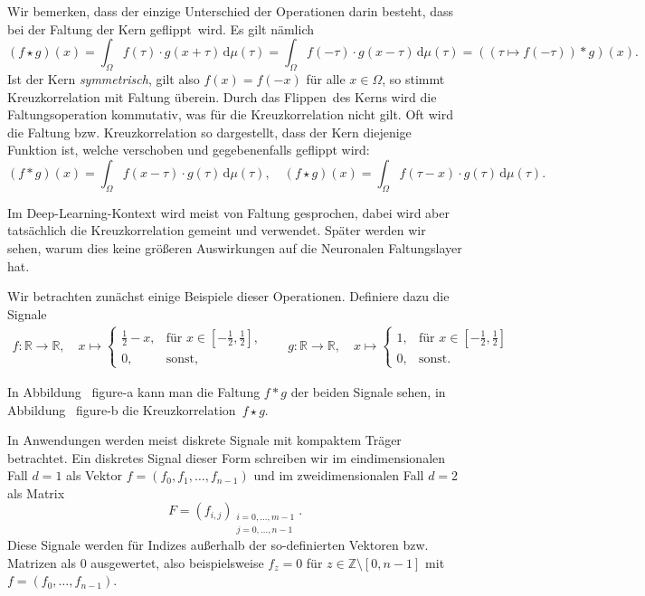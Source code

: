 \documentclass{article}
\theoremstyle{definition}
\newcommand{\R}{\mathbb{R}}
\newcommand{\Z}{\mathbb{Z}}
\newcommand{\diff}{\,\textrm{d}}
\newcommand{\todo}[1]{{\color{red} #1}}
\begin{document}
Wir bemerken, dass der einzige Unterschied der Operationen darin besteht, dass bei der Faltung der Kern \glqq geflippt\grqq\ wird.
Es gilt nämlich \[
    \left(f \star g\right)(x) = \int_{\Omega} f(\tau) \cdot g(x+\tau) \diff\mu(\tau) = \int_\Omega f(-\tau) \cdot g(x - \tau) \diff\mu(\tau) = \left((\tau\mapsto f(-\tau)) * g\right)(x).
    \]
Ist der Kern \emph{symmetrisch}, gilt also $f(x) = f(-x)$ für alle $x\in\Omega$, so stimmt Kreuzkorrelation mit Faltung überein.
Durch das \glqq Flippen\grqq\ des Kerns wird die Faltungsoperation kommutativ, was für die Kreuzkorrelation nicht gilt.
Oft wird die Faltung bzw. Kreuzkorrelation so dargestellt, dass der Kern diejenige Funktion ist, welche verschoben und gegebenenfalls geflippt wird:
\[
    (f*g)(x) = \int_\Omega f(x - \tau) \cdot g(\tau)\diff\mu(\tau), \quad
    (f\star g)(x) = \int_\Omega f(\tau - x) \cdot g(\tau) \diff\mu(\tau).
\]

Im Deep-Learning-Kontext wird meist von Faltung gesprochen, dabei wird aber tatsächlich die Kreuzkorrelation gemeint und verwendet.
\todo{Später werden wir sehen, warum dies keine größeren Auswirkungen auf die Neuronalen Faltungslayer hat.}

Wir betrachten zunächst einige Beispiele dieser Operationen.
Definiere dazu die Signale
\begin{align*}
    f: \R \rightarrow \R, \quad x \mapsto \begin{cases}
        \frac{1}{2} - x, & \text{für $x\in[-\frac{1}{2},\frac{1}{2}]$,}\\
        0, & \text{sonst,}
    \end{cases} \qquad
    g: \R \rightarrow \R,\quad x \mapsto \begin{cases}
        1,& \text{für $x \in [-\frac{1}{2},\frac{1}{2}]$}\\
        0, & \text{sonst.}
    \end{cases}
\end{align*}

In Abbildung~\todo{figure-a} kann man die Faltung $f * g$ der beiden Signale sehen, in Abbildung~\todo{figure-b} die Kreuzkorrelation~$f\star g$.


In Anwendungen werden meist diskrete Signale mit kompaktem Träger betrachtet.
Ein diskretes Signal dieser Form schreiben wir im eindimensionalen Fall $d=1$ als Vektor $f = (f_0, f_1, \dots, f_{n-1})$ und im zweidimensionalen Fall $d=2$ als Matrix $$F = (f_{i,j})_{\substack{i=0,\dots,m-1\\ j=0,\dots, n-1}}.$$
Diese Signale werden für Indizes außerhalb der so-definierten Vektoren bzw. Matrizen als $0$ ausgewertet, also beispielsweise $f_z = 0$ für $z\in\Z\setminus[0,n-1]$ mit $f=(f_0, \dots, f_{n-1})$.
\end{document}

